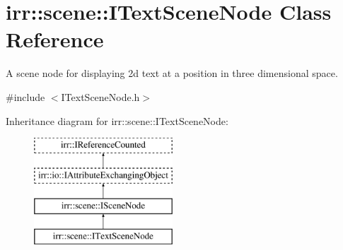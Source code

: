 \hypertarget{classirr_1_1scene_1_1ITextSceneNode}{}\section{irr\+:\+:scene\+:\+:I\+Text\+Scene\+Node Class Reference}
\label{classirr_1_1scene_1_1ITextSceneNode}


A scene node for displaying 2d text at a position in three dimensional space.  




{\ttfamily \#include $<$I\+Text\+Scene\+Node.\+h$>$}

Inheritance diagram for irr\+:\+:scene\+:\+:I\+Text\+Scene\+Node\+:\begin{figure}[H]
\begin{center}
\leavevmode
\includegraphics[height=4.000000cm]{classirr_1_1scene_1_1ITextSceneNode}
\end{center}
\end{figure}
